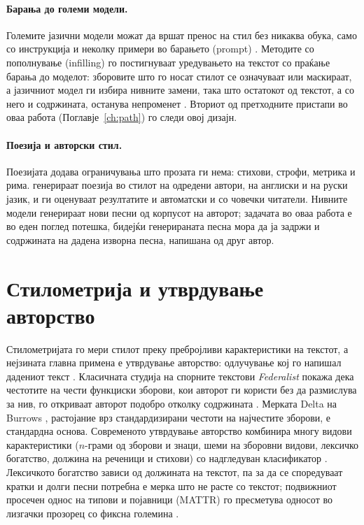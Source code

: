 \paragraph{Барања до големи модели.} Големите јазични модели можат да
вршат пренос на стил без никаква обука, само со инструкција и неколку
примери во барањето (prompt) \citep{reif2022recipe}. Методите со
пополнување (infilling) го постигнуваат уредувањето на текстот со праќање барања до моделот: зборовите
што го носат стилот се означуваат или маскираат, а јазичниот модел ги
избира нивните замени, така што остатокот од текстот, а со него и
содржината, останува непроменет \citep{pegf}. Вториот од претходните
пристапи во оваа работа (Поглавје~\ref{ch:path}) го следи овој дизајн.

\paragraph{Поезија и авторски стил.} Поезијата додава ограничувања што
прозата ги нема: стихови, строфи, метрика и рима.
\citet{tikhonov2018guesswho} генерираат поезија во стилот на одредени
автори, на англиски и на руски јазик, и ги оценуваат резултатите и
автоматски и со човечки читатели. Нивните модели генерираат нови песни
од корпусот на авторот; задачата во оваа работа е во еден поглед
потешка, бидејќи генерираната песна мора да ја задржи и содржината на
дадена изворна песна, напишана од друг автор.

\section{Стилометрија и утврдување авторство}

Стилометријата го мери стилот преку пребројливи карактеристики на
текстот, а нејзината главна примена е утврдување авторство:
одлучување кој го напишал дадениот текст \citep{stamatatos2009survey}.
Класичната студија на спорните текстови \emph{Federalist} покажа дека
честотите на чести функциски зборови, кои авторот ги користи без да
размислува за нив, го откриваат авторот подобро отколку содржината
\citep{mosteller1964}. Мерката Delta на Burrows \citep{burrows2002delta},
растојание врз стандардизирани честоти на најчестите зборови, е стандардна основа. 
Современото утврдување авторство комбинира
многу видови карактеристики ($n$-грами од зборови и знаци, шеми на
зборовни видови, лексичко богатство, должина на реченици и стихови) со
надгледуван класификатор \citep{stamatatos2009survey}. Лексичкото
богатство зависи од должината на текстот, па за да се споредуваат кратки
и долги песни потребна е мерка што не расте со текстот; подвижниот
просечен однос на типови и појавници (MATTR) го пресметува односот во
лизгачки прозорец со фиксна големина \citep{covington2010mattr}.

